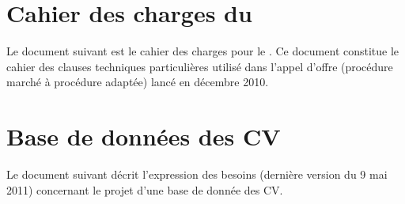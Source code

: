 \documentclass{book}
\begin{document}
\printindex

\chapter{Cahier des charges du }
\label{ch:annexe-crm}

Le document suivant est le cahier des charges pour le .
Ce document constitue le cahier des clauses techniques particulières
utilisé dans l'appel d'offre (procédure marché à procédure adaptée)
lancé en décembre 2010. 




\chapter{Base de données des CV}
\label{ch:rh-cvtheque}

Le document suivant décrit l'expression des besoins (dernière version du 9 mai 2011)
concernant le projet d'une base de donnée des CV.



\end{document}
